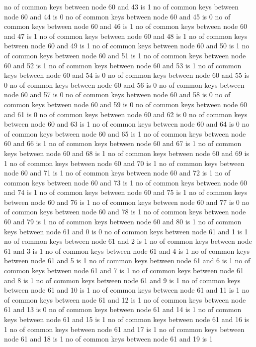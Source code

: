 no of common keys between node 60 and 43 is 1
no of common keys between node 60 and 44 is 0
no of common keys between node 60 and 45 is 0
no of common keys between node 60 and 46 is 1
no of common keys between node 60 and 47 is 1
no of common keys between node 60 and 48 is 1
no of common keys between node 60 and 49 is 1
no of common keys between node 60 and 50 is 1
no of common keys between node 60 and 51 is 1
no of common keys between node 60 and 52 is 1
no of common keys between node 60 and 53 is 1
no of common keys between node 60 and 54 is 0
no of common keys between node 60 and 55 is 0
no of common keys between node 60 and 56 is 0
no of common keys between node 60 and 57 is 0
no of common keys between node 60 and 58 is 0
no of common keys between node 60 and 59 is 0
no of common keys between node 60 and 61 is 0
no of common keys between node 60 and 62 is 0
no of common keys between node 60 and 63 is 1
no of common keys between node 60 and 64 is 0
no of common keys between node 60 and 65 is 1
no of common keys between node 60 and 66 is 1
no of common keys between node 60 and 67 is 1
no of common keys between node 60 and 68 is 1
no of common keys between node 60 and 69 is 1
no of common keys between node 60 and 70 is 1
no of common keys between node 60 and 71 is 1
no of common keys between node 60 and 72 is 1
no of common keys between node 60 and 73 is 1
no of common keys between node 60 and 74 is 1
no of common keys between node 60 and 75 is 1
no of common keys between node 60 and 76 is 1
no of common keys between node 60 and 77 is 0
no of common keys between node 60 and 78 is 1
no of common keys between node 60 and 79 is 1
no of common keys between node 60 and 80 is 1
no of common keys between node 61 and 0 is 0
no of common keys between node 61 and 1 is 1
no of common keys between node 61 and 2 is 1
no of common keys between node 61 and 3 is 1
no of common keys between node 61 and 4 is 1
no of common keys between node 61 and 5 is 1
no of common keys between node 61 and 6 is 1
no of common keys between node 61 and 7 is 1
no of common keys between node 61 and 8 is 1
no of common keys between node 61 and 9 is 1
no of common keys between node 61 and 10 is 1
no of common keys between node 61 and 11 is 1
no of common keys between node 61 and 12 is 1
no of common keys between node 61 and 13 is 0
no of common keys between node 61 and 14 is 1
no of common keys between node 61 and 15 is 1
no of common keys between node 61 and 16 is 1
no of common keys between node 61 and 17 is 1
no of common keys between node 61 and 18 is 1
no of common keys between node 61 and 19 is 1
